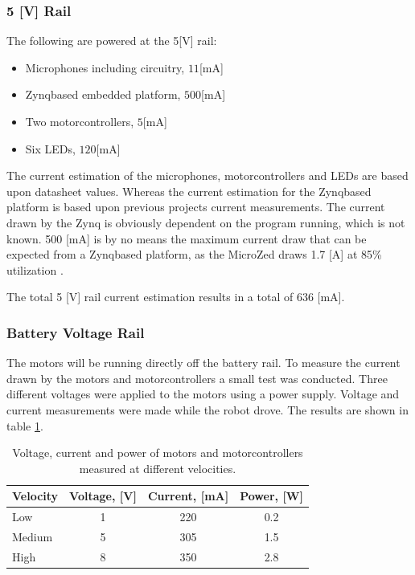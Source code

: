 \subsubsection*{5 [V] Rail} %

The following are powered at the 5[V] rail:
\begin{itemize}
	\item Microphones including circuitry, $11$[mA]
	\item Zynqbased embedded platform, $500$[mA]
	\item Two motorcontrollers, $5$[mA]
	\item Six LEDs, $120$[mA]
\end{itemize}
The current estimation of the microphones, motorcontrollers and LEDs are based upon datasheet values. 
Whereas the current estimation for the Zynqbased platform is based upon previous projects current measurements. 
The current drawn by the Zynq is obviously dependent on the program running, which is not known.
500 [mA] is by no means the maximum current draw that can be expected from a Zynqbased platform, as the MicroZed draws 1.7 [A] at 85\% utilization \cite{microzed_hardware_guide}.

The total 5 [V] rail current estimation results in a total of $636$ [mA].

\subsubsection*{Battery Voltage Rail} %

The motors will be running directly off the battery rail.
To measure the current drawn by the motors and motorcontrollers a small test was conducted.
Three different voltages were applied to the motors using a power supply. 
Voltage and current measurements were made while the robot drove. 
The results are shown in table \ref{tab:motor_power}.

\begin{table}[h]
\centering
\caption{Voltage, current and power of motors and motorcontrollers measured at different velocities.}
\label{tab:motor_power}
\begin{tabular}{|l|c|c|c|}
\hline
\textbf{Velocity} & Voltage, [V]   & Current, [mA] & Power, [W]      \\ \hline
Low     	& 1  & 220 & 0.2 \\ \hline
Medium 		& 5  & 305 & 1.5 \\ \hline
High        & 8  & 350 & 2.8 \\ \hline
\end{tabular}
\end{table}

